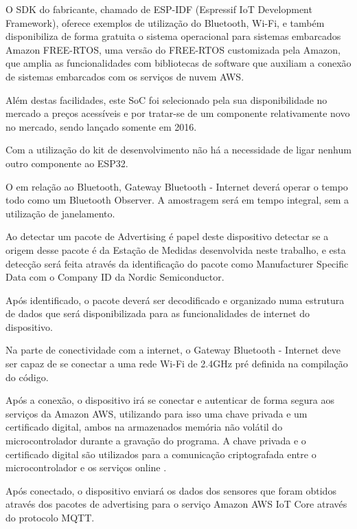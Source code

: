 O SDK do fabricante, chamado de ESP-IDF (Espressif IoT Development Framework),
oferece exemplos de utilização do Bluetooth, Wi-Fi, e também disponibiliza de
forma gratuita o sistema operacional para sistemas embarcados Amazon FREE-RTOS,
uma versão do FREE-RTOS customizada pela Amazon, que amplia as funcionalidades
com bibliotecas de software que auxiliam a conexão de sistemas embarcados com
os serviços de nuvem AWS.

Além destas facilidades, este SoC foi selecionado pela sua disponibilidade no
mercado a preços acessíveis e por tratar-se de um componente relativamente
novo no mercado, sendo lançado somente em 2016\cite{ESP32Datasheet}. 

Com a utilização do kit de desenvolvimento não há a necessidade de ligar nenhum
outro componente ao ESP32.


O em relação ao Bluetooth, Gateway Bluetooth - Internet deverá operar o tempo
todo como um Bluetooth Observer. A amostragem será em tempo integral, sem a
utilização de janelamento.

Ao detectar um pacote de Advertising é papel deste dispositivo detectar se a
origem desse pacote é da Estação de Medidas desenvolvida neste trabalho, e esta
detecção será feita através da identificação do pacote como Manufacturer
Specific Data com o Company ID da Nordic Semiconductor. 

Após identificado, o pacote deverá ser decodificado e organizado numa estrutura
de dados que será disponibilizada para as funcionalidades de internet do
dispositivo.


Na parte de conectividade com a internet, o Gateway Bluetooth - Internet deve
ser capaz de se conectar a uma rede Wi-Fi de 2.4GHz pré definida na compilação
do código.

Após a conexão, o dispositivo irá se conectar e autenticar de forma segura aos
serviços da Amazon AWS, utilizando para isso uma chave privada e um certificado
digital, ambos na armazenados memória não volátil do microcontrolador durante a
gravação do programa. A chave privada e o certificado digital são utilizados
para a comunicação criptografada entre o microcontrolador e os serviços
online \cite{AWS_IoTCore}.

Após conectado, o dispositivo enviará os dados dos sensores que foram obtidos
através dos pacotes de advertising para o serviço Amazon AWS IoT Core através do
protocolo MQTT.

